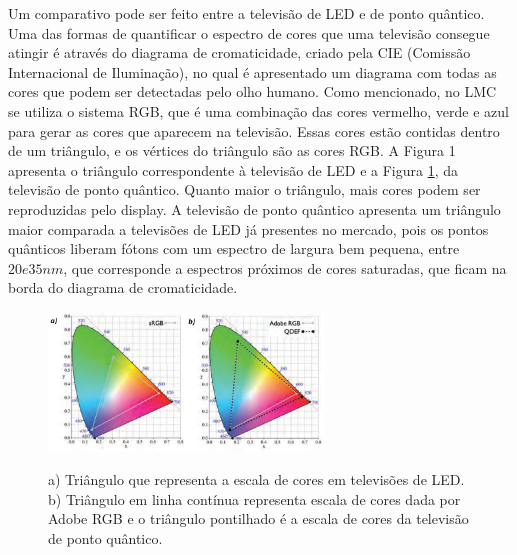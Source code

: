 		Um comparativo pode ser feito entre a televisão de LED e de ponto quântico. Uma das formas de quantificar o espectro de cores que uma televisão consegue atingir é através do diagrama de cromaticidade, criado pela CIE (Comissão Internacional de Iluminação), no qual é apresentado um diagrama com todas as cores que podem ser detectadas pelo olho humano. Como mencionado, no LMC se utiliza o sistema RGB, que é uma combinação das cores vermelho, verde e azul para gerar as cores que aparecem na televisão\cite{sintese11}. Essas cores estão contidas dentro de um triângulo, e os vértices do triângulo são as cores RGB. A Figura 1 apresenta o triângulo correspondente à televisão de LED e a Figura \ref{fig24}, da televisão de ponto quântico\cite{sintese12}. Quanto maior o triângulo, mais cores podem ser reproduzidas pelo display. A televisão de ponto quântico apresenta um triângulo maior comparada a televisões de LED já presentes no mercado, pois os pontos quânticos liberam fótons com um espectro de largura bem pequena, entre $20 e 35nm$, que corresponde a espectros próximos de cores saturadas, que ficam na borda do diagrama de cromaticidade\cite{sintese11}.

		\begin{figure}[H]
		  \centering
		  \caption{a) Triângulo que representa a escala de cores em televisões de LED. b) Triângulo em linha contínua representa escala de cores dada por Adobe RGB e o triângulo pontilhado é a escala de cores da televisão de ponto quântico.\cite{sintese12}}
		  \includegraphics[width=0.65\textwidth]{images/figura24.jpg}
		  \label{fig24}
		\end{figure}